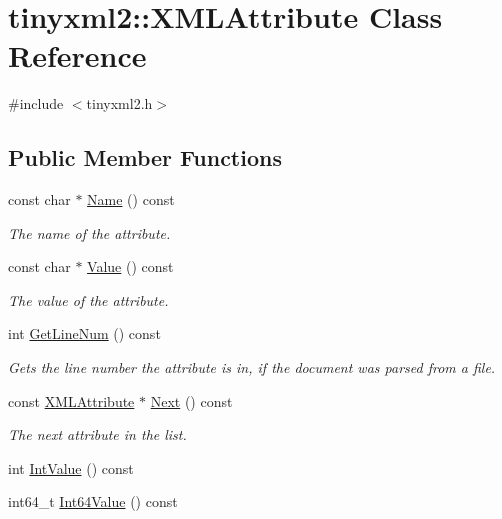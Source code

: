 \hypertarget{classtinyxml2_1_1_x_m_l_attribute}{}\section{tinyxml2\+:\+:X\+M\+L\+Attribute Class Reference}
\label{classtinyxml2_1_1_x_m_l_attribute}


{\ttfamily \#include $<$tinyxml2.\+h$>$}

\subsection*{Public Member Functions}
\begin{DoxyCompactItemize}
\item 
const char $\ast$ \hyperlink{classtinyxml2_1_1_x_m_l_attribute_a5a5c135d24cce7abda6f17301c6274d8}{Name} () const
\begin{DoxyCompactList}\small\item\em The name of the attribute. \end{DoxyCompactList}\item 
const char $\ast$ \hyperlink{classtinyxml2_1_1_x_m_l_attribute_ab1c5cd993f836a771818ca408994b14e}{Value} () const
\begin{DoxyCompactList}\small\item\em The value of the attribute. \end{DoxyCompactList}\item 
int \hyperlink{classtinyxml2_1_1_x_m_l_attribute_a02d5ea924586e35f9c13857d1671b765}{Get\+Line\+Num} () const
\begin{DoxyCompactList}\small\item\em Gets the line number the attribute is in, if the document was parsed from a file. \end{DoxyCompactList}\item 
const \hyperlink{classtinyxml2_1_1_x_m_l_attribute}{X\+M\+L\+Attribute} $\ast$ \hyperlink{classtinyxml2_1_1_x_m_l_attribute_aee53571b21e7ce5421eb929523a8bbe6}{Next} () const
\begin{DoxyCompactList}\small\item\em The next attribute in the list. \end{DoxyCompactList}\item 
int \hyperlink{classtinyxml2_1_1_x_m_l_attribute_adfa2433f0fdafd5c3880936de9affa80}{Int\+Value} () const
\item 
int64\+\_\+t \hyperlink{classtinyxml2_1_1_x_m_l_attribute_a8762ed54f147c5744ada55c3d04d27f2}{Int64\+Value} () const

\end{DoxyCompactItemize}
